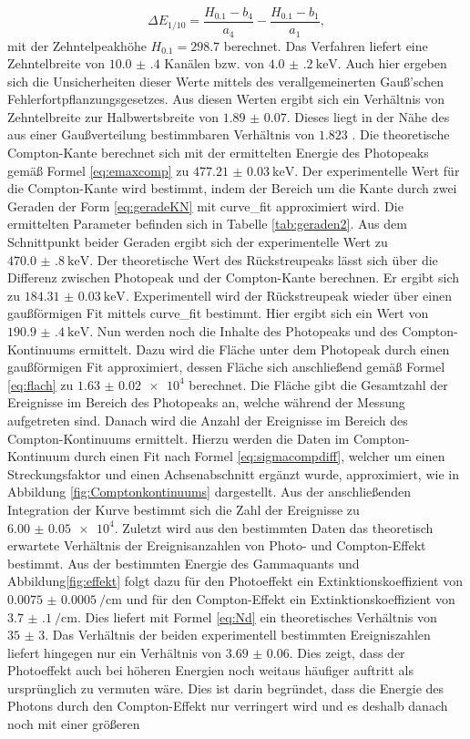 \begin{equation}
    \Delta E_\text{1/10} = \frac{H_{0.1}-b_4}{a_4} - \frac{H_{0.1}-b_1}{a_1}, \label{eq:Z2}
\end{equation}
mit der Zehntelpeakhöhe $H_{0.1}=\num{298.7}$ berechnet.
Das Verfahren liefert eine Zehntelbreite von $\num{10.0(4)}$ Kanälen bzw. von $\SI{4.0(2)}{\kilo\electronvolt}$. Auch hier ergeben sich die Unsicherheiten dieser Werte mittels des verallgemeinerten Gauß’schen Fehlerfortpflanzungsgesetzes. Aus diesen Werten ergibt sich ein Verhältnis von Zehntelbreite zur Halbwertsbreite von $\num{1.89(7)}$. Dieses liegt in der Nähe des aus einer Gaußverteilung bestimmbaren Verhältnis von $\num{1.823}$  \cite{V18}. Die theoretische Compton-Kante berechnet sich mit der ermittelten Energie des Photopeaks gemäß Formel \eqref{eq:emaxcomp} zu $\SI{477.21(3)}{\kilo\electronvolt}$. Der experimentelle Wert für die Compton-Kante wird bestimmt, indem der Bereich um die Kante durch zwei Geraden der Form \eqref{eq:geradeKN} mit curve\_fit \cite{scipy} approximiert wird. Die ermittelten Parameter befinden sich in Tabelle \ref{tab:geraden2}. Aus dem Schnittpunkt beider Geraden ergibt sich der experimentelle Wert zu $\SI{470.0(8)}{\kilo\electronvolt}$. Der theoretische Wert des Rückstreupeaks lässt sich über die Differenz zwischen Photopeak und der Compton-Kante berechnen. Er ergibt sich zu $\SI{184.31(3)}{\kilo\electronvolt}$. Experimentell wird der Rückstreupeak wieder über einen gaußförmigen Fit mittels curve\_fit bestimmt. Hier ergibt sich ein Wert von $\SI{190.9(4)}{\kilo\electronvolt}$. Nun werden noch die Inhalte des Photopeaks und des Compton-Kontinuums ermittelt. Dazu wird die Fläche unter dem Photopeak durch einen gaußförmigen Fit approximiert, dessen Fläche sich anschließend gemäß Formel \eqref{eq:flach} zu $\num{1.63(2)e4}$ berechnet. Die Fläche gibt die Gesamtzahl der Ereignisse im Bereich des Photopeaks an, welche während der Messung aufgetreten sind. Danach wird die Anzahl der Ereignisse im Bereich des Compton-Kontinuums ermittelt. Hierzu werden die Daten im Compton-Kontinuum durch einen Fit nach Formel \eqref{eq:sigmacompdiff}, welcher um einen Streckungsfaktor und einen Achsenabschnitt ergänzt wurde, approximiert, wie in Abbildung \ref{fig:Comptonkontinuums} dargestellt. Aus der anschließenden Integration der Kurve bestimmt sich die Zahl der Ereignisse zu $\num{6.00(5)e4}$. Zuletzt wird aus den bestimmten Daten das theoretisch erwartete Verhältnis der Ereignisanzahlen von Photo- und Compton-Effekt bestimmt. Aus der bestimmten Energie des Gammaquants und Abbildung\ref{fig:effekt} folgt dazu für den Photoeffekt ein Extinktionskoeffizient von $\SI{0.0075(5)}{\per\centi\meter}$ und für den Compton-Effekt ein Extinktionskoeffizient von $\SI{3.7(1)}{\per\centi\meter}$. Dies liefert mit Formel \eqref{eq:Nd} ein theoretisches Verhältnis von $\num{35(3)}$. Das Verhältnis der beiden experimentell bestimmten Ereigniszahlen liefert hingegen nur ein Verhältnis von $\num{3.69(6)}$. Dies zeigt, dass der Photoeffekt auch bei höheren Energien noch weitaus häufiger auftritt als ursprünglich zu vermuten wäre. Dies ist darin begründet, dass die Energie des Photons durch den Compton-Effekt nur verringert wird und es deshalb danach noch mit einer größeren 
